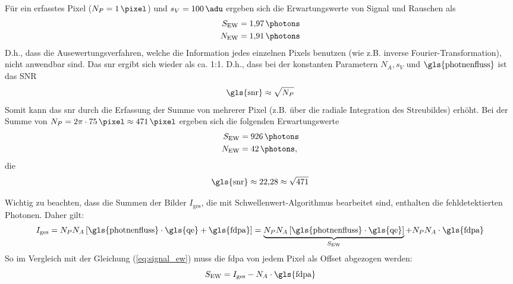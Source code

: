 \noindent
Für ein erfasstes Pixel ($N_P = \SI{1}{\pixel}$) und $s_V = \SI{100}{\adu}$ ergeben sich die Erwartungswerte von Signal und Rauschen als
\begin{equation}
    \begin{split}
        S_\text{EW} &= \SI{1.97}{\photons}\\
        N_\text{EW} &= \SI{1.91}{\photons}\\
    \end{split}
\end{equation}
\noindent
D.h., dass die Ausewertungsverfahren, welche die Information jedes einzelnen Pixels benutzen (wie z.B. inverse Fourier-Transformation), nicht anwendbar sind. Das \gls{snr} ergibt sich wieder als ca. 1:1. D.h., dass bei der konstanten Parametern $N_A, s_V$ und $\text{\gls{photnenfluss}}$ ist das SNR
\begin{equation}
    \text{\gls{snr}} \approx \sqrt{N_P}
\end{equation}
\noindent
Somit kann das \gls{snr} durch die Erfassung der Summe von mehrerer Pixel (z.B. über die radiale Integration des Streubildes) erhöht. Bei der Summe von $N_P = 2\pi\cdot\SI{75}{\pixel} \approx \SI{471}{\pixel}$ ergeben sich die folgenden Erwartungswerte
\begin{equation}
    \begin{split}
        S_\text{EW} &= \SI{926}{\photons}\\
        N_\text{EW} &= \SI{42}{\photons},
    \end{split}
\end{equation}
die 
\begin{equation}
    \text{\gls{snr}} \approx \num{22.28} \approx \sqrt{471}
\end{equation}

\noindent
Wichtig zu beachten, dass die Summen der Bilder $I_\text{ges}$, die  mit Schwellenwert-Algorithmus bearbeitet sind, enthalten die fehldetektierten Photonen. Daher gilt:
\begin{equation}
    I_\text{ges} = N_P N_A \left[\text{\gls{photnenfluss}}\cdot \text{\gls{qe}} + \text{\gls{fdpa}}\right] = \underbrace{N_P N_A \left[\text{\gls{photnenfluss}}\cdot \text{\gls{qe}}\right]}_{S_\text{EW}} + N_P N_A\cdot\text{\gls{fdpa}}
\end{equation}
So im Vergleich mit der Gleichung (\ref{eq:signal_ew}) muss die \gls{fdpa} von jedem Pixel als Offset abgezogen werden:
\begin{equation}
    S_\text{EW} = I_\text{ges} -N_A\cdot\text{\gls{fdpa}}
\end{equation}

